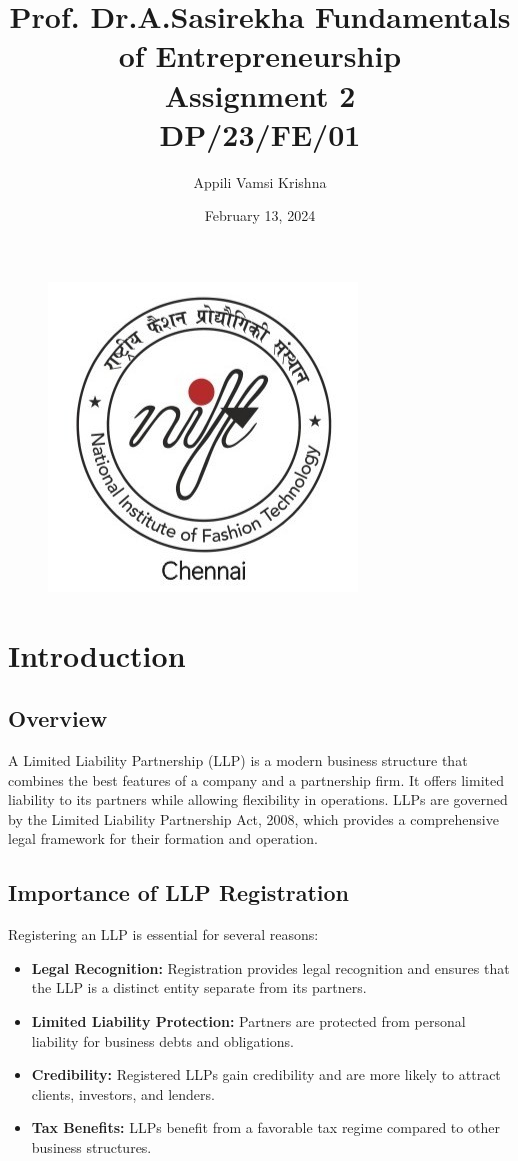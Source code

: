 \documentclass{article}
\title{  Prof. Dr.A.Sasirekha    Fundamentals of Entrepreneurship  \\    Assignment 2  \\ \textbf{DP/23/FE/01}}
\author{ Appili Vamsi Krishna}
\date{February 13, 2024}
\begin{document}
\Large
\maketitle
\begin{figure}[h!]
    \centering
    \includegraphics[scale=0.4]{1668605206895.jpg}
\end{figure}



  \newpage

 \tableofcontents

\newpage




\chapter{Introduction}
\section{Overview}
A Limited Liability Partnership (LLP) is a modern business structure that combines the best features of a company and a partnership firm. It offers limited liability to its partners while allowing flexibility in operations. LLPs are governed by the Limited Liability Partnership Act, 2008, which provides a comprehensive legal framework for their formation and operation.

\section{Importance of LLP Registration}
Registering an LLP is essential for several reasons:
\begin{itemize}
    \item \textbf{Legal Recognition:} Registration provides legal recognition and ensures that the LLP is a distinct entity separate from its partners.
    \item \textbf{Limited Liability Protection:} Partners are protected from personal liability for business debts and obligations.
    \item \textbf{Credibility:} Registered LLPs gain credibility and are more likely to attract clients, investors, and lenders.
    \item \textbf{Tax Benefits:} LLPs benefit from a favorable tax regime compared to other business structures.
\end{itemize}
\end{document}
